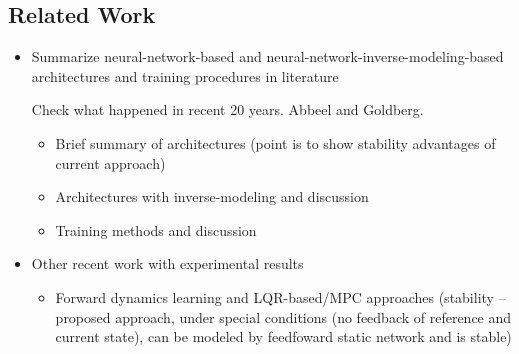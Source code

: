 \subsection{Related Work}
\begin{itemize}
\item Summarize neural-network-based and neural-network-inverse-modeling-based architectures and training procedures in literature 

\todo Check what happened in recent 20 years. Abbeel and Goldberg.

\begin{itemize}
\item Brief summary of architectures (point is to show stability advantages of current approach)
\item Architectures with inverse-modeling and discussion 
\item Training methods and discussion
\end{itemize}
\item Other recent work with experimental results

\begin{itemize}
\item Forward dynamics learning and LQR-based/MPC approaches (stability -- proposed approach, under special conditions (no feedback of reference and current state), can be modeled by feedfoward static network and is stable)
\end{itemize}
\end{itemize}
